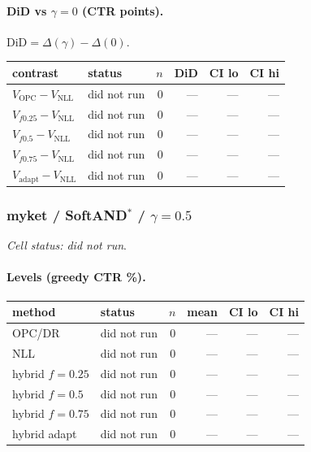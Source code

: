 \documentclass[10pt,a4paper]{article}
\begin{document}
\paragraph{DiD vs $\gamma=0$ (CTR points).} $\mathrm{DiD}=\Delta(\gamma)-\Delta(0)$.
{\centering\small\begin{tabular}{llrrrr}
\toprule contrast & status & $n$ & DiD & CI lo & CI hi \\
\midrule
$V_{\mathrm{OPC}}-V_{\mathrm{NLL}}$ & did not run & 0 & --- & --- & --- \\
$V_{f0.25}-V_{\mathrm{NLL}}$ & did not run & 0 & --- & --- & --- \\
$V_{f0.5}-V_{\mathrm{NLL}}$ & did not run & 0 & --- & --- & --- \\
$V_{f0.75}-V_{\mathrm{NLL}}$ & did not run & 0 & --- & --- & --- \\
$V_{\mathrm{adapt}}-V_{\mathrm{NLL}}$ & did not run & 0 & --- & --- & --- \\
\bottomrule\end{tabular}\par}
\bigskip
\subsubsection{myket / SoftAND$^*$ / $\gamma=0.5$}
\emph{Cell status: did not run}.
\paragraph{Levels (greedy CTR \%).}
{\centering\small\begin{tabular}{llrrrr}
\toprule method & status & $n$ & mean & CI lo & CI hi \\
\midrule
OPC/DR & did not run & 0 & --- & --- & --- \\
NLL & did not run & 0 & --- & --- & --- \\
hybrid $f{=}0.25$ & did not run & 0 & --- & --- & --- \\
hybrid $f{=}0.5$ & did not run & 0 & --- & --- & --- \\
hybrid $f{=}0.75$ & did not run & 0 & --- & --- & --- \\
hybrid adapt & did not run & 0 & --- & --- & --- \\
\bottomrule\end{tabular}\par}
\end{document}
